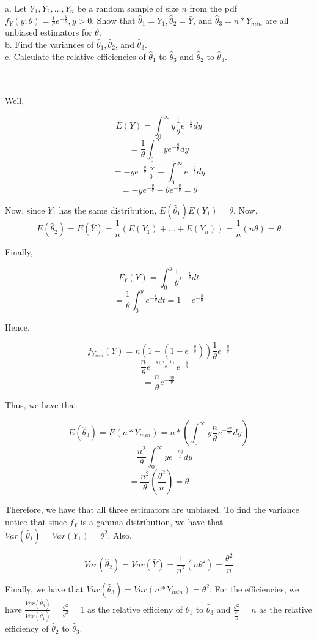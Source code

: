 a. Let $Y_1,Y_2,\ldots,Y_n$ be a random sample of size $n$ from the pdf
$f_Y(y;\theta)=\frac{1}{\theta}e^{-\frac{y}{\theta}}, y>0$. Show that
$\hat{\theta}_1=Y_1, \hat{\theta}_2=\bar{Y}$, and $\hat{\theta}_3=n*Y_{min}$ are all unbiased estimators
for $\theta$.\\

b.  Find the variances of $\hat{\theta}_1, \hat{\theta}_2$, and $\hat{\theta}_3$.\\

c. Calculate the relative efficiencies of $\hat{\theta}_1$ to $\hat{\theta}_3$ and $\hat{\theta}_2$ to
$\hat{\theta}_3$.\\\\

\begin{solution}\renewcommand{\qedsymbol}{}\ \\
    Well,
    
    $$E(Y)=\int_0^{\infty}y\frac{1}{\theta}e^{-\frac{y}{\theta}}dy$$
    $$=\frac{1}{\theta}\int_0^{\infty}ye^{-\frac{y}{\theta}}dy$$
    $$=-ye^{-\frac{y}{\theta}}|_0^{\infty}+\int_0^{\infty}e^{-\frac{y}{\theta}}dy$$
    $$=-ye^{-\frac{y}{\theta}}-\theta e^{-\frac{y}{\theta}}=\theta$$
    
    Now, since $Y_1$ has the same distribution, $E(\hat{\theta}_1)E(Y_1)=\theta$. Now,
    $$E(\hat{\theta}_2)=E(\bar{Y})=\frac1n(E(Y_1)+\ldots+E(Y_n))=\frac1n(n\theta)=\theta$$
    
    Finally,
    
    $$F_Y(Y)=\int_0^y\frac{1}{\theta}e^{-\frac{t}{\theta}}dt$$
    $$=\frac{1}{\theta}\int_0^ye^{-\frac{t}{\theta}}dt=1-e^{-\frac{y}{\theta}}$$
    
    Hence,
    
    $$f_{Y_{min}}(Y)=n(1-(1-e^{-\frac{y}{\theta}}))\frac{1}{\theta}e^{-\frac{y}{\theta}}$$
    $$=\frac{n}{\theta}e^{-\frac{y(n-1)}{\theta}}e^{-\frac{y}{\theta}}$$
    $$=\frac{n}{\theta}e^{-\frac{ny}{\theta}}$$
    
    Thus, we have that
    
    $$E(\hat{\theta}_3)=E(n*Y_{min})=n*(\int_0^{\infty}y\frac{n}{\theta}e^{-\frac{ny}{\theta}}dy)$$
    $$=\frac{n^2}{\theta}\int_0^{\infty}ye^{-\frac{ny}{\theta}}dy$$
    $$=\frac{n^2}{\theta}(\frac{\theta^2}{n})=\theta$$
    
    Therefore, we have that all three estimators are unbiased. To find the variance notice that since
    $f_Y$ is a gamma distribution, we have that $Var(\hat{\theta}_1)=Var(Y_1)=\theta^2$. Also,
    
    $$Var(\hat{\theta}_2)=Var(\bar{Y})=\frac{1}{n^2}(n\theta^2)=\frac{\theta^2}{n}$$
    
    Finally, we have that $Var(\hat{\theta}_3)=Var(n*Y_{min})=\theta^2$. For the efficiencies, we have
    $\frac{Var(\hat{\theta}_3)}{Var(\hat{\theta}_1)}=\frac{\theta^2}{\theta^2}=1$ as the relative
    efficieny of $\hat{\theta}_1$ to $\hat{\theta}_3$ and $\frac{\theta^2}{\frac{\theta^2}{n}}=n$ as the
    relative efficiency of $\hat{\theta}_2$ to $\hat{\theta}_3$.



\end{solution}